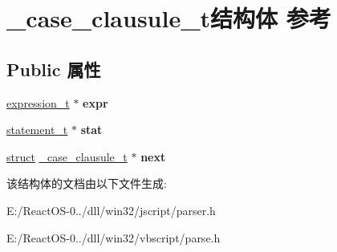 \hypertarget{struct__case__clausule__t}{}\section{\+\_\+case\+\_\+clausule\+\_\+t结构体 参考}
\label{struct__case__clausule__t}
\subsection*{Public 属性}
\begin{DoxyCompactItemize}
\item 
\mbox{\label{struct__case__clausule__t_a983ace78798c270743d0bd15ea7f3a29}} 
\hyperlink{struct__expression__t}{expression\+\_\+t} $\ast$ {\bfseries expr}
\item 
\mbox{\label{struct__case__clausule__t_a54281af2dd8bab75987212b6a418e3f1}} 
\hyperlink{struct__statement__t}{statement\+\_\+t} $\ast$ {\bfseries stat}
\item 
\mbox{\label{struct__case__clausule__t_a488f24afd7d84e65f28a6a92419cf950}} 
\hyperlink{interfacestruct}{struct} \hyperlink{struct__case__clausule__t}{\+\_\+case\+\_\+clausule\+\_\+t} $\ast$ {\bfseries next}
\end{DoxyCompactItemize}


该结构体的文档由以下文件生成\+:\begin{DoxyCompactItemize}
\item 
E\+:/\+React\+O\+S-\/0../dll/win32/jscript/parser.\+h\item 
E\+:/\+React\+O\+S-\/0../dll/win32/vbscript/parse.\+h\end{DoxyCompactItemize}
